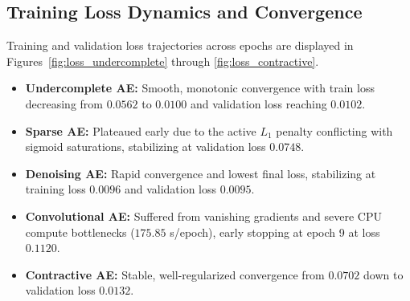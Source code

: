 \documentclass[12pt, a4paper]{article}
\begin{document}
\subsection{Training Loss Dynamics and Convergence}
Training and validation loss trajectories across epochs are displayed in Figures~\ref{fig:loss_undercomplete} through \ref{fig:loss_contractive}.
\begin{itemize}[noitemsep]
    \item \textbf{Undercomplete AE:} Smooth, monotonic convergence with train loss decreasing from $0.0562$ to $0.0100$ and validation loss reaching $0.0102$.
    \item \textbf{Sparse AE:} Plateaued early due to the active $L_1$ penalty conflicting with sigmoid saturations, stabilizing at validation loss $0.0748$.
    \item \textbf{Denoising AE:} Rapid convergence and lowest final loss, stabilizing at training loss $0.0096$ and validation loss $0.0095$.
    \item \textbf{Convolutional AE:} Suffered from vanishing gradients and severe CPU compute bottlenecks ($175.85$ s/epoch), early stopping at epoch 9 at loss $0.1120$.
    \item \textbf{Contractive AE:} Stable, well-regularized convergence from $0.0702$ down to validation loss $0.0132$.
\end{itemize}
\end{document}
